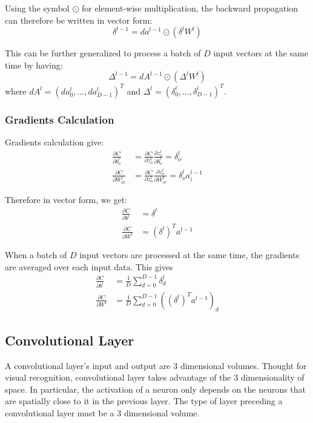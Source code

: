 \documentclass{article} %
\begin{document}
Using the symbol $\odot$ for element-wise multiplication, the backward propagation can therefore be written in vector form:
$$
\delta^{l-1} = da^{l-1} \odot \left(\delta^l W^l\right)
$$

This can be further generalized to process a batch of $D$ input vectors at the same time by having:
$$
\Delta^{l-1} = dA^{l-1} \odot \left(\Delta^l W^l\right) 
$$
where $dA^l = (da_0^l, ... , da_{D-1}^l)^T$ and $\Delta^l = (\delta_0^l, ... , \delta_{D-1}^l)^T$.

\subsubsection{Gradients Calculation}
Gradients calculation give:
$$
\begin{aligned}
\frac{\partial C}{\partial b^l_o}    
&= \frac{\partial C}{\partial z^l_o} \frac{\partial z^l_o}{\partial b^l_o}  = \delta^l_o \\
\frac{\partial C}{\partial W^l_{oi}} 
&= \frac{\partial C}{\partial z^l_o} \frac{\partial z^l_o}{\partial W^l_{oi}}  = \delta^l_o a^{l-1}_i
\end{aligned}
$$

Therefore in vector form, we get:
$$
\begin{aligned}
\frac{\partial C}{\partial b^l} &= \delta^l \\
\frac{\partial C}{\partial W^l} &= (\delta^l)^T a^{l-1}
\end{aligned}
$$

When a batch of $D$ input vectors are processed at the same time, the gradients are averaged over each input data. This gives
$$
\begin{aligned}
\frac{\partial C}{\partial b^l} &= \frac{1}{D}\sum_{d=0}^{D-1} \delta^l_d \\
\frac{\partial C}{\partial W^l} &= \frac{1}{D}\sum_{d=0}^{D-1} \left((\delta^l)^T a^{l-1}\right)_d
\end{aligned}
$$

\subsection{Convolutional Layer}
A convolutional layer's input and output are 3 dimensional volumes. Thought for visual recognition, convolutional layer takes advantage of the 3 dimensionality of space. In particular, the activation of a neuron only depends on the neurons that are spatially close to it in the previous layer. The type of layer preceding a convolutional layer must be a 3 dimensional volume.
\end{document}

